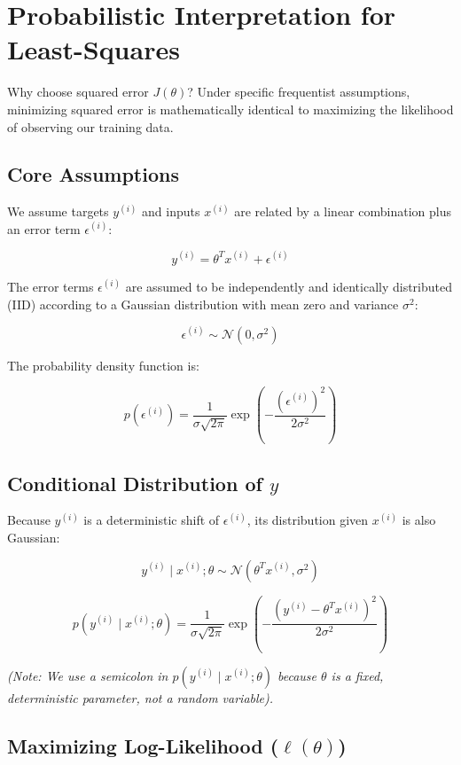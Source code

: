 \documentclass[12pt, a4paper]{report}
\begin{document}
\section{Probabilistic Interpretation for Least-Squares}

Why choose squared error $J(\theta)$? Under specific frequentist assumptions, minimizing squared error is mathematically identical to maximizing the likelihood of observing our training data.

\subsection{Core Assumptions}

We assume targets $y^{(i)}$ and inputs $x^{(i)}$ are related by a linear combination plus an error term $\epsilon^{(i)}$:

\[ y^{(i)} = \theta^T x^{(i)} + \epsilon^{(i)} \]

The error terms $\epsilon^{(i)}$ are assumed to be independently and identically distributed (IID) according to a Gaussian distribution with mean zero and variance $\sigma^2$:

\[ \epsilon^{(i)} \sim \mathcal{N}(0, \sigma^2) \]

The probability density function is:

\[ p(\epsilon^{(i)}) = \frac{1}{\sigma\sqrt{2\pi}} \exp\left( -\frac{(\epsilon^{(i)})^2}{2\sigma^2} \right) \]

\subsection{Conditional Distribution of $y$}

Because $y^{(i)}$ is a deterministic shift of $\epsilon^{(i)}$, its distribution given $x^{(i)}$ is also Gaussian:

\[ y^{(i)} \mid x^{(i)}; \theta \sim \mathcal{N}(\theta^T x^{(i)}, \sigma^2) \]

\[ p(y^{(i)} \mid x^{(i)}; \theta) = \frac{1}{\sigma\sqrt{2\pi}} \exp\left( -\frac{(y^{(i)} - \theta^T x^{(i)})^2}{2\sigma^2} \right) \]

\textit{(Note: We use a semicolon in $p(y^{(i)} \mid x^{(i)}; \theta)$ because $\theta$ is a fixed, deterministic parameter, not a random variable).}

\subsection{Maximizing Log-Likelihood ($\ell(\theta)$)}
\end{document}
